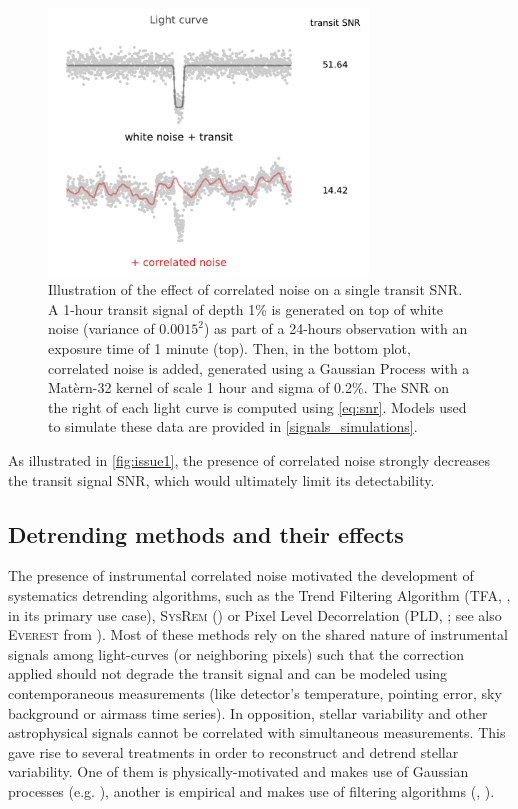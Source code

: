 \documentclass{aastex631}
\begin{document}
\begin{figure}[H]
    \begin{centering}
        \includegraphics[width=8.5cm]{issue1.pdf}
        \caption{Illustration of the effect of correlated noise on a single transit SNR. A 1-hour transit signal of depth 1\% is generated on top of white noise (variance of $0.0015^2$) as part of a 24-hours observation with an exposure time of 1 minute (top). Then, in the bottom plot, correlated noise is added, generated using a Gaussian Process with a Matèrn-32 kernel of scale 1 hour and sigma of 0.2\%. The SNR on the right of each light curve is computed using \autoref{eq:snr}. Models used to simulate these data are provided in \autoref{signals_simulations}.}
        \label{fig:issue1}
    \end{centering}
\end{figure}

As illustrated in \autoref{fig:issue1}, the presence of correlated noise strongly decreases the transit signal SNR, which would ultimately limit its detectability. 

\subsection{Detrending methods and their effects}\label{detrending_effect}
The presence of instrumental correlated noise motivated the development of systematics detrending algorithms, such as the Trend Filtering Algorithm (\textsc{TFA}, \citealt{tfa}, in its primary use case), \textsc{SysRem} (\citealt{sysrem}) or Pixel Level Decorrelation (\textsc{PLD}, \citealt{pld}; see also \textsc{Everest} from \citealt{everest1, everest2}). Most of these methods rely on the shared nature of instrumental signals among light-curves (or neighboring pixels) such that the correction applied should not degrade the transit signal and can be modeled using contemporaneous measurements (like detector's temperature, pointing error, sky background or airmass time series). In opposition, stellar variability and other astrophysical signals cannot be correlated with simultaneous measurements. This gave rise to several treatments in order to reconstruct and detrend stellar variability. One of them is physically-motivated and makes use of Gaussian processes (e.g. \citealt{k2sc}), another is empirical and makes use of filtering algorithms (\citealt{Jenkins2010}, \citealt{wotan}).
\end{document}
